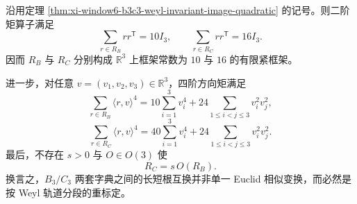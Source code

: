 \begin{theorem}\label{thm:xi-window6-b3c3-tight-frame-fourth-moment-nonsimilarity}
沿用定理 \ref{thm:xi-window6-b3c3-weyl-invariant-image-quadratic} 的记号。则二阶矩算子满足
\[
\boxed{\;
\sum_{r\in R_B}rr^{\mathsf T}=10I_3,
\qquad
\sum_{r\in R_C}rr^{\mathsf T}=16I_3.\;}
\]
因而 \(R_B\) 与 \(R_C\) 分别构成 \(\mathbb R^3\) 上框架常数为 \(10\) 与 \(16\) 的有限紧框架。

进一步，对任意 \(v=(v_1,v_2,v_3)\in\mathbb R^3\)，四阶方向矩满足
\[
\boxed{\;
\sum_{r\in R_B}\langle r,v\rangle^4
=
10\sum_{i=1}^3 v_i^4
+24\sum_{1\le i<j\le 3}v_i^2v_j^2,\;}
\]
\[
\boxed{\;
\sum_{r\in R_C}\langle r,v\rangle^4
=
40\sum_{i=1}^3 v_i^4
+24\sum_{1\le i<j\le 3}v_i^2v_j^2.\;}
\]
最后，不存在 \(s>0\) 与 \(O\in O(3)\) 使
\[
R_C=s\,O(R_B).
\]
换言之，\(B_3/C_3\) 两套字典之间的长短根互换并非单一 Euclid 相似变换，而必然是按 Weyl 轨道分段的重标定。
\end{theorem}
